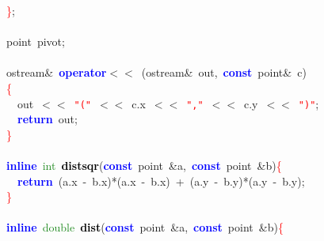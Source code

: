 {{\mbox{}\textcolor{Red}{\}}\textcolor{BrickRed}{;} \\
\mbox{} \\
\mbox{}point\ pivot\textcolor{BrickRed}{;} \\
\mbox{} \\
\mbox{}ostream\textcolor{BrickRed}{\&}\ \textbf{\textcolor{Blue}{operator}}\textcolor{BrickRed}{$<$$<$}\ \textcolor{BrickRed}{(}ostream\textcolor{BrickRed}{\&}\ out\textcolor{BrickRed}{,}\ \textbf{\textcolor{Blue}{const}}\ point\textcolor{BrickRed}{\&}\ c\textcolor{BrickRed}{)} \\
\mbox{}\textcolor{Red}{\{} \\
\mbox{}\ \ out\ \textcolor{BrickRed}{$<$$<$}\ \texttt{\textcolor{Red}{"{}("{}}}\ \textcolor{BrickRed}{$<$$<$}\ c\textcolor{BrickRed}{.}x\ \textcolor{BrickRed}{$<$$<$}\ \texttt{\textcolor{Red}{"{},"{}}}\ \textcolor{BrickRed}{$<$$<$}\ c\textcolor{BrickRed}{.}y\ \textcolor{BrickRed}{$<$$<$}\ \texttt{\textcolor{Red}{"{})"{}}}\textcolor{BrickRed}{;} \\
\mbox{}\ \ \textbf{\textcolor{Blue}{return}}\ out\textcolor{BrickRed}{;} \\
\mbox{}\textcolor{Red}{\}} \\
\mbox{} \\
\mbox{}\textbf{\textcolor{Blue}{inline}}\ \textcolor{ForestGreen}{int}\ \textbf{\textcolor{Black}{distsqr}}\textcolor{BrickRed}{(}\textbf{\textcolor{Blue}{const}}\ point\ \textcolor{BrickRed}{\&}a\textcolor{BrickRed}{,}\ \textbf{\textcolor{Blue}{const}}\ point\ \textcolor{BrickRed}{\&}b\textcolor{BrickRed}{)}\textcolor{Red}{\{} \\
\mbox{}\ \ \textbf{\textcolor{Blue}{return}}\ \textcolor{BrickRed}{(}a\textcolor{BrickRed}{.}x\ \textcolor{BrickRed}{-}\ b\textcolor{BrickRed}{.}x\textcolor{BrickRed}{)*(}a\textcolor{BrickRed}{.}x\ \textcolor{BrickRed}{-}\ b\textcolor{BrickRed}{.}x\textcolor{BrickRed}{)}\ \textcolor{BrickRed}{+}\ \textcolor{BrickRed}{(}a\textcolor{BrickRed}{.}y\ \textcolor{BrickRed}{-}\ b\textcolor{BrickRed}{.}y\textcolor{BrickRed}{)*(}a\textcolor{BrickRed}{.}y\ \textcolor{BrickRed}{-}\ b\textcolor{BrickRed}{.}y\textcolor{BrickRed}{);} \\
\mbox{}\textcolor{Red}{\}} \\
\mbox{} \\
\mbox{}\textbf{\textcolor{Blue}{inline}}\ \textcolor{ForestGreen}{double}\ \textbf{\textcolor{Black}{dist}}\textcolor{BrickRed}{(}\textbf{\textcolor{Blue}{const}}\ point\ \textcolor{BrickRed}{\&}a\textcolor{BrickRed}{,}\ \textbf{\textcolor{Blue}{const}}\ point\ \textcolor{BrickRed}{\&}b\textcolor{BrickRed}{)}\textcolor{Red}{\{} \\
}}
